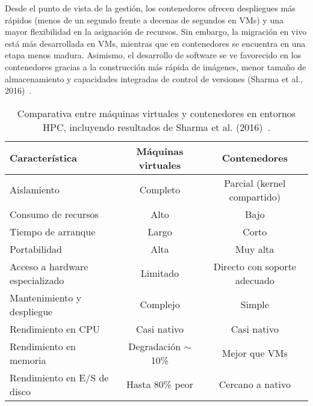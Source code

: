 Desde el punto de vista de la gestión, los contenedores ofrecen despliegues más rápidos (menos de un segundo frente a decenas de segundos en VMs) y una mayor flexibilidad en la asignación de recursos. Sin embargo, la migración en vivo está más desarrollada en VMs, mientras que en contenedores se encuentra en una etapa menos madura. Asimismo, el desarrollo de software se ve favorecido en los contenedores gracias a la construcción más rápida de imágenes, menor tamaño de almacenamiento y capacidades integradas de control de versiones (Sharma et al., 2016)~\cite{sharma2016containers}.

\begin{table}[h]
    \centering
    \begin{tabular}{lcc}
        \toprule
        \textbf{Característica}         & \textbf{Máquinas virtuales} & \textbf{Contenedores}        \\
        \midrule
        Aislamiento                     & Completo                    & Parcial (kernel compartido)  \\
        Consumo de recursos             & Alto                        & Bajo                         \\
        Tiempo de arranque              & Largo                       & Corto                        \\
        Portabilidad                    & Alta                        & Muy alta                     \\
        Acceso a hardware especializado & Limitado                    & Directo con soporte adecuado \\
        Mantenimiento y despliegue      & Complejo                    & Simple                       \\
        Rendimiento en CPU              & Casi nativo                 & Casi nativo                  \\
        Rendimiento en memoria          & Degradación $\sim$10\%      & Mejor que VMs                \\
        Rendimiento en E/S de disco     & Hasta 80\% peor             & Cercano a nativo             \\
        \bottomrule
    \end{tabular}
    \caption{Comparativa entre máquinas virtuales y contenedores en entornos HPC, incluyendo resultados de Sharma et al. (2016)~\cite{sharma2016containers}.}
    \label{tab:vm_vs_container}
\end{table}


